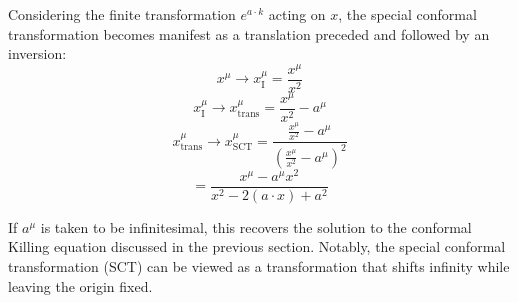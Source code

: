 \documentclass[12pt]{article}
\numberwithin{equation}{section}
\newcommand\<\langle
\renewcommand\>\rangle
\renewcommand\.{\cdot}
\begin{document}
Considering the finite transformation \( e^{a \cdot k} \) acting on \( x \), the special conformal transformation becomes manifest as a translation preceded and followed by an inversion:
\[
    x^{\mu} \rightarrow x_{\text{I}}^{\mu} = \frac{x^{\mu}}{x^2}
\]
\[
    x_{\text{I}}^{\mu} \rightarrow x_{\text{trans}}^{\mu} = \frac{x^{\mu}}{x^2} - a^{\mu}
\]
\[
    x_{\text{trans}}^{\mu} \rightarrow x_{\text{SCT}}^{\mu} = \frac{\frac{x^{\mu}}{x^2} - a^{\mu}}{\left(\frac{x^{\mu}}{x^2} - a^{\mu}\right)^2}
\]
\[
    = \frac{x^{\mu} - a^{\mu} x^2}{x^2 - 2(a \cdot x) + a^2}
\]

If \( a^{\mu} \) is taken to be infinitesimal, this recovers the solution to the conformal Killing equation discussed in the previous section. Notably, the special conformal transformation (SCT) can be viewed as a transformation that shifts infinity while leaving the origin fixed.



\end{document}
